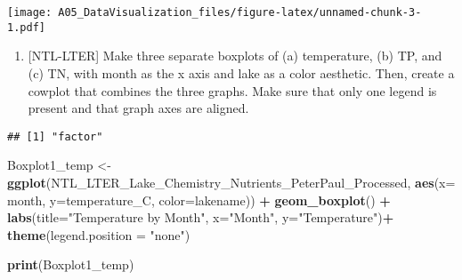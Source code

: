 \documentclass[
]{article}
\newenvironment{Shaded}{\begin{snugshade}}{\end{snugshade}}
\newcommand{\CommentTok}[1]{\textcolor[rgb]{0.56,0.35,0.01}{\textit{#1}}}
\newcommand{\DataTypeTok}[1]{\textcolor[rgb]{0.13,0.29,0.53}{#1}}
\newcommand{\KeywordTok}[1]{\textcolor[rgb]{0.13,0.29,0.53}{\textbf{#1}}}
\newcommand{\NormalTok}[1]{#1}
\newcommand{\OperatorTok}[1]{\textcolor[rgb]{0.81,0.36,0.00}{\textbf{#1}}}
\newcommand{\StringTok}[1]{\textcolor[rgb]{0.31,0.60,0.02}{#1}}
\providecommand{\tightlist}{%
  \setlength{\itemsep}{0pt}\setlength{\parskip}{0pt}}
\begin{document}
\texttt{[image: A05\_DataVisualization\_files/figure-latex/unnamed-chunk-3-1.pdf]}

\begin{enumerate}
\def\labelenumi{\arabic{enumi}.}
\setcounter{enumi}{4}
\tightlist
\item
  {[}NTL-LTER{]} Make three separate boxplots of (a) temperature, (b)
  TP, and (c) TN, with month as the x axis and lake as a color
  aesthetic. Then, create a cowplot that combines the three graphs. Make
  sure that only one legend is present and that graph axes are aligned.
\end{enumerate}

\begin{Shaded}
\end{Shaded}

\begin{verbatim}
## [1] "factor"
\end{verbatim}

\begin{Shaded}
\begin{Highlighting}[]
\NormalTok{Boxplot1_temp <-}\StringTok{ }\KeywordTok{ggplot}\NormalTok{(NTL_LTER_Lake_Chemistry_Nutrients_PeterPaul_Processed,}
                        \KeywordTok{aes}\NormalTok{(}\DataTypeTok{x=}\NormalTok{ month, }\DataTypeTok{y=}\NormalTok{temperature_C, }\DataTypeTok{color=}\NormalTok{lakename)) }\OperatorTok{+}
\StringTok{  }\KeywordTok{geom_boxplot}\NormalTok{() }\OperatorTok{+}
\StringTok{  }\KeywordTok{labs}\NormalTok{(}\DataTypeTok{title=}\StringTok{"Temperature by Month"}\NormalTok{,}
  \DataTypeTok{x=}\StringTok{"Month"}\NormalTok{,}
  \DataTypeTok{y=}\StringTok{"Temperature"}\NormalTok{)}\OperatorTok{+}
\StringTok{  }\KeywordTok{theme}\NormalTok{(}\DataTypeTok{legend.position =} \StringTok{"none"}\NormalTok{)}

\KeywordTok{print}\NormalTok{(Boxplot1_temp)}
\end{Highlighting}
\end{Shaded}
\end{document}
